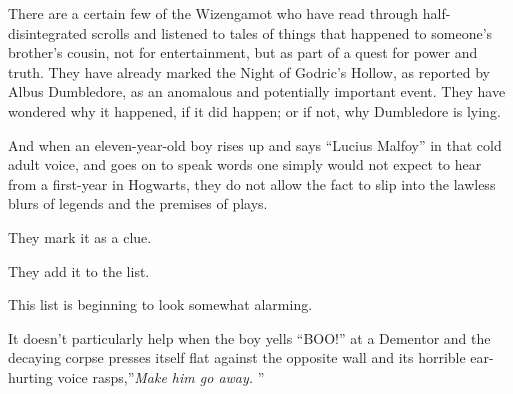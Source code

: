 There are a certain few of the Wizengamot who have read through
half-disintegrated scrolls and listened to tales of things that happened
to someone's brother's cousin, not for entertainment, but as part of a
quest for power and truth. They have already marked the Night of
Godric's Hollow, as reported by Albus Dumbledore, as an anomalous and
potentially important event. They have wondered why it happened, if it
did happen; or if not, why Dumbledore is lying.

And when an eleven-year-old boy rises up and says ``Lucius Malfoy'' in
that cold adult voice, and goes on to speak words one simply would not
expect to hear from a first-year in Hogwarts, they do not allow the fact
to slip into the lawless blurs of legends and the premises of plays.

They mark it as a clue.

They add it to the list.

This list is beginning to look somewhat alarming.

It doesn't particularly help when the boy yells ``BOO!'' at a Dementor
and the decaying corpse presses itself flat against the opposite wall
and its horrible ear-hurting voice rasps,''\emph{Make him go away.} ''
